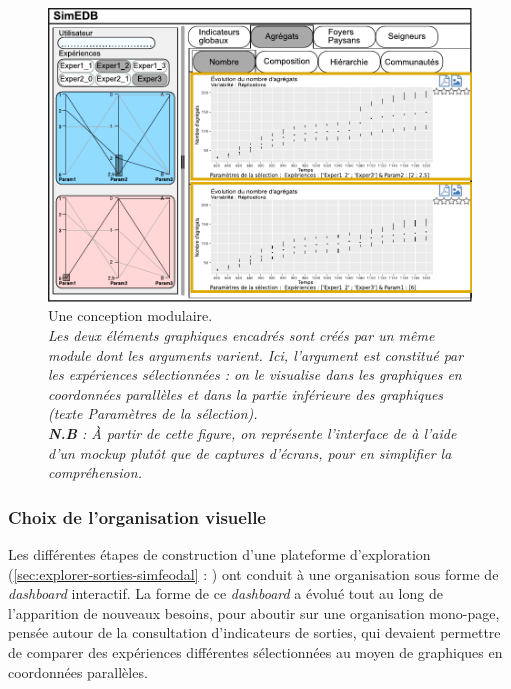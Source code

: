 \begin{figure}[H]
	\centering
	\includegraphics[width=\linewidth]{img/mockup_SimEDB_modules.pdf}
	\caption[Une conception modulaire.]{Une conception modulaire.\\
		\textit{Les deux éléments graphiques encadrés sont créés par un même \og module\fg{} dont les arguments varient.
		Ici, l'argument est constitué par les expériences sélectionnées : on le visualise dans les graphiques en coordonnées parallèles et dans la partie inférieure des graphiques (texte \og Paramètres de la sélection\fg{}).\\
		\textbf{N.B} : À partir de cette figure, on représente l'interface de \simedb{} à l'aide d'un \textit{mockup} plutôt que de captures d'écrans, pour en simplifier la compréhension.}}
	\label{fig:simedb-modules}
\end{figure}


\subsubsection{Choix de l'organisation visuelle}

Les différentes étapes de construction d'une plateforme d'exploration (\cref{sec:explorer-sorties-simfeodal} : ) ont conduit à une organisation sous forme de \textit{dashboard} interactif.
La forme de ce \textit{dashboard} a évolué tout au long de l'apparition de nouveaux besoins, pour aboutir sur une organisation mono-page, pensée autour de la consultation d'indicateurs de sorties, qui devaient permettre de comparer des expériences différentes sélectionnées au moyen de graphiques en coordonnées parallèles.

